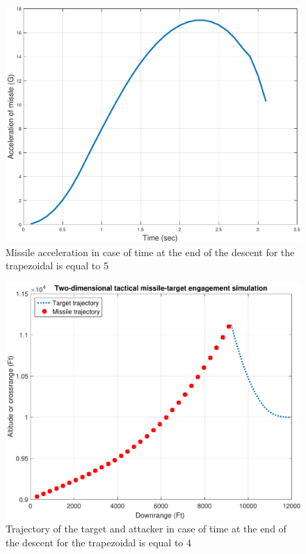 \begin{figure}[htb]
	\centering
	\includegraphics[scale = 0.75]{fig/MissileAccelerationT2.pdf}
	\caption{Missile acceleration in case of time at the end of the descent for the trapezoidal is equal to 5 }
	\label{missile accelerationT2}
\end{figure}


\begin{figure}[htb]
	\centering
	\includegraphics[scale = 0.75]{fig/trajectoryT3.pdf}
	\caption{Trajectory of the target and attacker in case of time at the end of the descent for the trapezoidal is equal to 4 }
	\label{trajectoryT3}
\end{figure}


